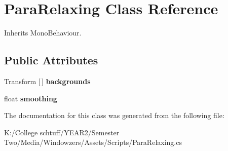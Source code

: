 \hypertarget{class_para_relaxing}{}\section{Para\+Relaxing Class Reference}
\label{class_para_relaxing}


Inherits Mono\+Behaviour.

\subsection*{Public Attributes}
\begin{DoxyCompactItemize}
\item 
\mbox{\label{class_para_relaxing_ab2ee5f66eec2ee7b8510a2ec83a9e2dd}} 
Transform \mbox{[}$\,$\mbox{]} {\bfseries backgrounds}
\item 
\mbox{\label{class_para_relaxing_a46c890c25c9cd0bb971db6db50ae5132}} 
float {\bfseries smoothing}
\end{DoxyCompactItemize}


The documentation for this class was generated from the following file\+:\begin{DoxyCompactItemize}
\item 
K\+:/\+College schtuff/\+Y\+E\+A\+R2/\+Semester Two/\+Media/\+Windowzers/\+Assets/\+Scripts/Para\+Relaxing.\+cs\end{DoxyCompactItemize}
